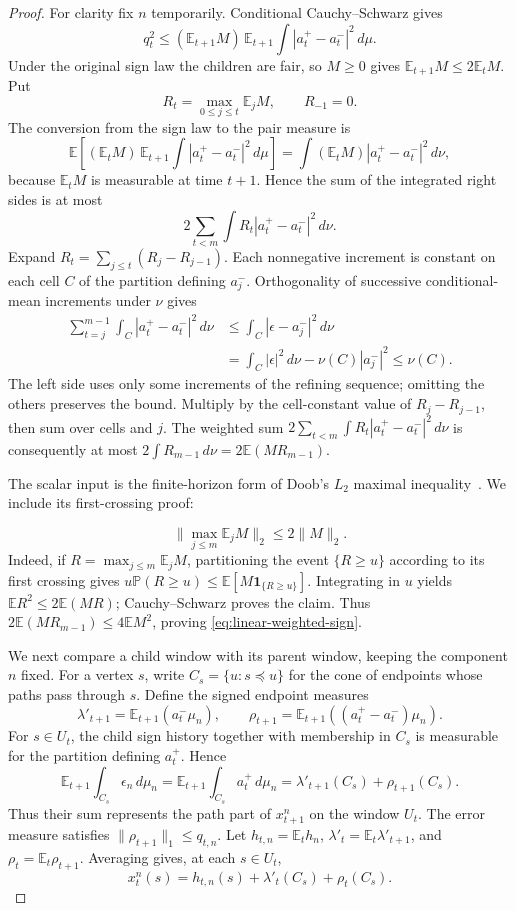 \begin{proof}
For clarity fix \(n\) temporarily.  Conditional Cauchy--Schwarz gives
\[
 q_t^2\le(\mathbb E_{t+1}M)\,
       \mathbb E_{t+1}\int|a_t^+-a_t^-|^2\,d\mu.
\]
Under the original sign law the children are fair, so \(M\ge0\) gives
\(\mathbb E_{t+1}M\le2\mathbb E_tM\).  Put
\[
 R_t=\max_{0\le j\le t}\mathbb E_jM,\qquad R_{-1}=0.
\]
The conversion from the sign law to the pair measure is
\[
 \mathbb E\left[(\mathbb E_tM)\,
   \mathbb E_{t+1}\int|a_t^+-a_t^-|^2\,d\mu\right]
 =\int(\mathbb E_tM)|a_t^+-a_t^-|^2\,d\nu,
\]
because \(\mathbb E_tM\) is measurable at time \(t+1\). Hence the
sum of the integrated right sides is at most
\[
 2\sum_{t<m}\int R_t|a_t^+-a_t^-|^2\,d\nu.
\]
Expand \(R_t=\sum_{j\le t}(R_j-R_{j-1})\). Each nonnegative increment
is constant on each cell \(C\) of the partition defining \(a_j^-\).
Orthogonality of successive conditional-mean increments under \(\nu\)
gives
\[
 \begin{aligned}
 \sum_{t=j}^{m-1}\int_C|a_t^+-a_t^-|^2\,d\nu
 &\le\int_C|\epsilon-a_j^-|^2\,d\nu\\
 &=\int_C|\epsilon|^2\,d\nu-\nu(C)|a_j^-|^2
 \le\nu(C).
 \end{aligned}
\]
The left side uses only some increments of the refining sequence;
omitting the others preserves the bound. Multiply by the cell-constant
value of \(R_j-R_{j-1}\), then sum over cells and \(j\). The weighted
sum \(2\sum_{t<m}\int R_t|a_t^+-a_t^-|^2\,d\nu\) is consequently at most
\(2\int R_{m-1}\,d\nu=2\mathbb E(MR_{m-1})\).

The scalar input is the finite-horizon form of Doob's $L_2$ maximal
inequality~\cite{Doob1953}.  We include its first-crossing proof:

\[
 \Big\|\max_{j\le m}\mathbb E_jM\Big\|_2\le2\|M\|_2.
\]
Indeed, if \(R=\max_{j\le m}\mathbb E_jM\), partitioning the event
\(\{R\ge u\}\) according to its first crossing gives
\(u\mathbb P(R\ge u)\le\mathbb E[M\mathbf1_{\{R\ge u\}}]\).
Integrating in \(u\) yields
\(\mathbb ER^2\le2\mathbb E(MR)\); Cauchy--Schwarz proves the claim.
Thus \(2\mathbb E(MR_{m-1})\le4\mathbb EM^2\), proving
\eqref{eq:linear-weighted-sign}.

We next compare a child window with its parent window, keeping the
component \(n\) fixed.  For a vertex \(s\), write
\(C_s=\{u:s\preceq u\}\) for the cone of endpoints whose paths pass
through \(s\). Define the signed endpoint measures
\[
 \lambda'_{t+1}=\mathbb E_{t+1}(a_t^-\mu_n),
 \qquad
 \rho_{t+1}=\mathbb E_{t+1}((a_t^+-a_t^-)\mu_n).
\]
For \(s\in U_t\), the child sign history together with membership
in \(C_s\) is measurable for the partition defining \(a_t^+\). Hence
\[
 \mathbb E_{t+1}\int_{C_s}\epsilon_n\,d\mu_n
 =\mathbb E_{t+1}\int_{C_s}a_t^+\,d\mu_n
 =\lambda'_{t+1}(C_s)+\rho_{t+1}(C_s).
\]
Thus their sum represents the path part of \(x_{t+1}^n\) on the window
\(U_t\). The error measure satisfies \(\|\rho_{t+1}\|_1\le q_{t,n}\).
Let \(h_{t,n}=\mathbb E_th_n\),
\(\lambda'_t=\mathbb E_t\lambda'_{t+1}\), and
\(\rho_t=\mathbb E_t\rho_{t+1}\).  Averaging gives, at each
\(s\in U_t\),
\begin{equation}\label{eq:linear-parent-path}
 x_t^n(s)=h_{t,n}(s)+\lambda'_t(C_s)+\rho_t(C_s).
\end{equation}


\end{proof}

